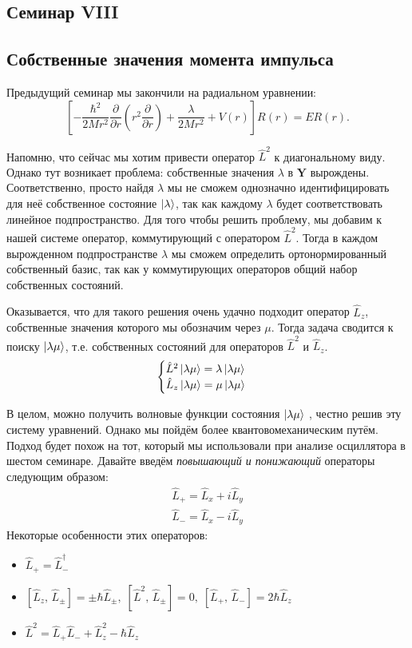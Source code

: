 \begin{center}
    \section{Семинар VIII}
\end{center}
\subsection{Собственные значения момента импульса}
\hspace{1em} Предыдущий семинар мы закончили на радиальном уравнении:
\[
\left[-\frac{\hbar^2}{2Mr^2}\frac{\partial}{\partial r}\left( r^2 \frac{\partial}{\partial r}\right)  + \frac{\lambda}{2Mr^2} + V(r)\right]R(r) = ER(r).
\]

Напомню, что сейчас мы хотим привести оператор $\hat{L}^2$ к диагональному виду. Однако тут возникает проблема: собственные значения $\lambda$ в $\mathbf{Y}$ вырождены. Соответственно, просто найдя $\lambda$ мы не сможем однозначно идентифицировать для неё собственное состояние $\ket{\lambda}$, так как каждому $\lambda$ будет соответствовать линейное подпространство. Для того чтобы решить проблему, мы добавим к нашей системе оператор, коммутирующий с оператором $\hat{L}^2$. Тогда в каждом вырожденном подпространстве $\lambda$ мы сможем определить ортонормированный собственный базис, так как у коммутирующих операторов общий набор собственных состояний. 

Оказывается, что для такого решения очень удачно подходит оператор $\hat{L}_z$, собственные значения которого мы обозначим через $\mu$. Тогда задача сводится к поиску $\ket{\lambda\mu}$, т.е. собственных состояний для операторов $\hat{L}^2$ и $\hat{L}_z$.
\[
    \begin{cases}
        \hat{L}^2\ket{\lambda\mu} = \lambda\ket{\lambda\mu}\\
        \hat{L}_z\ket{\lambda\mu} = \mu\ket{\lambda\mu}
    \end{cases}
\]

В целом, можно получить волновые функции состояния $\ket{\lambda\mu}$ , честно решив эту систему уравнений. Однако мы пойдём более квантовомеханическим путём. Подход будет похож на тот, который мы использовали при анализе осциллятора в шестом семинаре. Давайте введём \textit{повышающий и понижающий} операторы следующим образом:
\begin{equation*}
    \begin{split}
        \hat{L}_+ = \hat{L}_x + i\hat{L}_y  \\
        \hat{L}_- = \hat{L}_x - i\hat{L}_y 
    \end{split}
\end{equation*}
Некоторые особенности этих операторов:
\begin{itemize}
    \item $\hat{L}_+ = \hat{L}^{\dagger}_-$
    \item $[\hat{L}_z, \, \hat{L}_{\pm}] = \pm\hbar \hat{L}_{\pm},\; [\hat{L}^2, \, \hat{L}_{\pm}] = 0, \; [\hat{L}_+, \, \hat{L}_- ] = 2\hbar \hat{L}_z $
    \item $\hat{L}^2 = \hat{L}_+\hat{L}_- + \hat{L}^2_z - \hbar\hat{L}_z$
\end{itemize}

